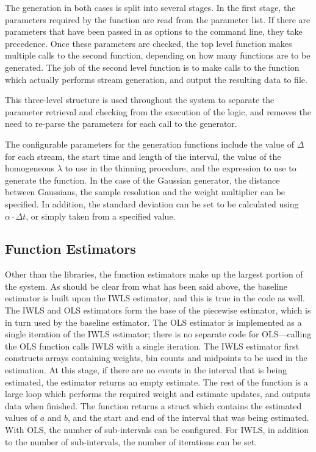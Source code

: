 \documentclass[a4paper,11pt,twoside]{article}
\begin{document}
   The generation in both cases is split into several stages. In the first
   stage, the parameters required by the function are read from the parameter
   list. If there are parameters that have been passed in as options to the
   command line, they take precedence. Once these parameters are checked, the
   top level function makes multiple calls to the second function, depending on
   how many functions are to be generated. The job of the second level function
   is to make calls to the function which actually performs stream generation,
   and output the resulting data to file.

   This three-level structure is used throughout the system to separate the
   parameter retrieval and checking from the execution of the logic, and removes
   the need to re-parse the parameters for each call to the generator.

   The configurable parameters for the generation functions include the value
   of $\Delta$ for each stream, the start time and length of the interval, the
   value of the homogeneous $\lambda$ to use in the thinning procedure, and the
   expression to use to generate the function. In the case of the Gaussian
   generator, the distance between Gaussians, the sample resolution and the
   weight multiplier can be specified. In addition, the standard deviation can
   be set to be calculated using $\alpha\cdot\Delta t$, or simply taken from a
   specified value.
\subsection{Function Estimators}
\label{sec-6-7}

   Other than the libraries, the function estimators make up the largest portion
   of the system. As should be clear from what has been said above, the baseline
   estimator is built upon the IWLS estimator, and this is true in the code as
   well. The IWLS and OLS estimators form the base of the piecewise estimator,
   which is in turn used by the baseline estimator. The OLS estimator is
   implemented as a single iteration of the IWLS estimator; there is no separate
   code for OLS---calling the OLS function calls IWLS with a single
   iteration. The IWLS estimator first constructs arrays containing weights, bin
   counts and midpoints to be used in the estimation. At this stage, if there
   are no events in the interval that is being estimated, the estimator returns
   an empty estimate. The rest of the function is a large loop which performs
   the required weight and estimate updates, and outputs data when finished. The
   function returns a struct which contains the estimated values of $a$ and $b$,
   and the start and end of the interval that was being estimated. With OLS, the
   number of sub-intervals can be configured. For IWLS, in addition to the
   number of sub-intervals, the number of iterations can be set.
\end{document}
